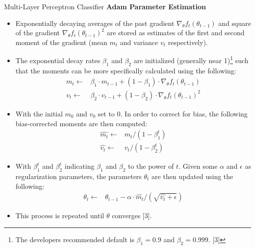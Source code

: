 \documentclass[titlepage,leqno]{beamer}%
\begin{document}
\begin{frame}{Multi-Layer Perceptron Classifier}
\tiny
\textbf{Adam Parameter Estimation}

\begin{itemize}
	\item Exponentially decaying averages of the past gradient $\nabla_\theta f_t(\theta_{t-1})$ and 
	square of the gradient $\nabla_\theta f_t(\theta_{t-1})^2$ are stored as estimates of the first 
	and second moment of the gradient (mean $m_t$ and variance $v_t$ respectively).
	\item The exponential decay rates $\beta_1$ and $\beta_2$ are initialized (generally near 1)\footnote{The 
	developers recommended default is $\beta_1 = 0.9$ and $\beta_2 = 0.999$. [3]} such that the moments can be 
	more specifically calculated using the following:
	\begin{align*}
	m_t \leftarrow& \beta_1 \cdot m_{t-1} + (1-\beta_1)\cdot \nabla_\theta f_t(\theta_{t-1})\\
	v_t \leftarrow& \beta_2 \cdot v_{t-1} + (1-\beta_2)\cdot \nabla_\theta f_t(\theta_{t-1})^2 
	\end{align*}
	\item With the initial $m_0$ and $v_0$ set to 0. In order to correct for bias, the following bias-corrected 
	moments are then computed:
	\begin{align*}
	\hat{m_t} \leftarrow& m_t/(1-\beta_1^t)\\
	\hat{v_t} \leftarrow& v_t/(1-\beta_2^t)
	\end{align*}
	\item With $\beta_1^t$ and $\beta_2^t$ indicating $\beta_1$ and $\beta_2$ to the power of $t$. 
	Given some $\alpha$ and $\epsilon$ as regularization parameters, the parameters $\theta_t$ are then 
	updated using the following:
	\begin{align*}
	\theta_t \leftarrow& \theta_{t-1} - \alpha \cdot \hat{m_t}/(\sqrt{\hat{v_t}+\epsilon})
	\end{align*}
	\item This process is repeated until $\theta$ converges [3].
\end{itemize}

\end{frame}
\end{document}

